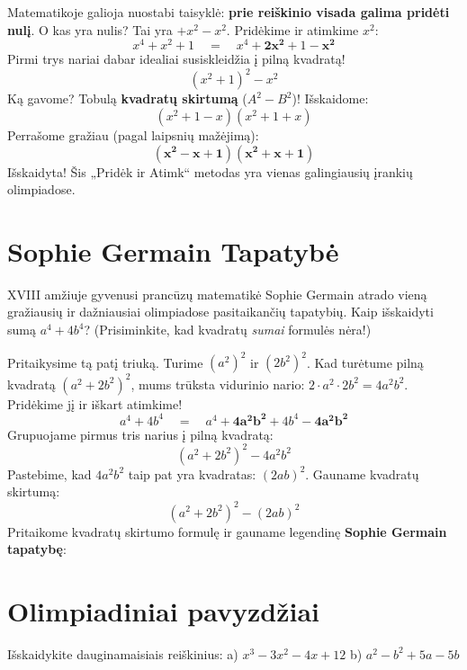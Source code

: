 \documentclass[11pt,a4paper]{scrartcl}
\begin{document}
Matematikoje galioja nuostabi taisyklė: \textbf{prie reiškinio visada galima pridėti nulį}. 
O kas yra nulis? Tai yra $+x^2 - x^2$. 
Pridėkime ir atimkime $x^2$:
\[ x^4 + x^2 + 1 \quad = \quad x^4 + \mathbf{2x^2} + 1 - \mathbf{x^2} \]
Pirmi trys nariai dabar idealiai susiskleidžia į pilną kvadratą!
\[ (x^2 + 1)^2 - x^2 \]
Ką gavome? Tobulą \textbf{kvadratų skirtumą} ($A^2 - B^2$)! Išskaidome:
\[ (x^2 + 1 - x)(x^2 + 1 + x) \]
Perrašome gražiau (pagal laipsnių mažėjimą):
\[ \mathbf{(x^2 - x + 1)(x^2 + x + 1)} \]
Išskaidyta! Šis „Pridėk ir Atimk“ metodas yra vienas galingiausių įrankių olimpiadose.

\section{Sophie Germain Tapatybė}

XVIII amžiuje gyvenusi prancūzų matematikė Sophie Germain atrado vieną gražiausių ir dažniausiai olimpiadose pasitaikančių tapatybių. Kaip išskaidyti sumą $a^4 + 4b^4$? (Prisiminkite, kad kvadratų \textit{sumai} formulės nėra!)

Pritaikysime tą patį triuką. Turime $(a^2)^2$ ir $(2b^2)^2$. Kad turėtume pilną kvadratą $(a^2 + 2b^2)^2$, mums trūksta vidurinio nario: $2 \cdot a^2 \cdot 2b^2 = 4a^2b^2$. 
Pridėkime jį ir iškart atimkime!
\[ a^4 + 4b^4 \quad = \quad a^4 + \mathbf{4a^2b^2} + 4b^4 - \mathbf{4a^2b^2} \]
Grupuojame pirmus tris narius į pilną kvadratą:
\[ (a^2 + 2b^2)^2 - 4a^2b^2 \]
Pastebime, kad $4a^2b^2$ taip pat yra kvadratas: $(2ab)^2$. Gauname kvadratų skirtumą:
\[ (a^2 + 2b^2)^2 - (2ab)^2 \]
Pritaikome kvadratų skirtumo formulę ir gauname legendinę \textbf{Sophie Germain tapatybę}:
\begin{center}
\end{center}

\section{Olimpiadiniai pavyzdžiai}

\begin{example}
Išskaidykite dauginamaisiais reiškinius:
a) $x^3 - 3x^2 - 4x + 12$
b) $a^2 - b^2 + 5a - 5b$
\end{example}
\end{document}
